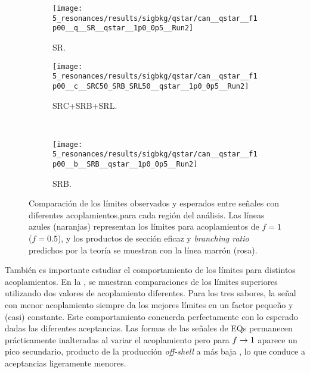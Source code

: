 \begin{figure}[ht!]
    \centering
    \begin{subfigure}[t]{0.49\linewidth}
        \centering
        \texttt{[image: 5\_resonances/results/sigbkg/qstar/can\_\_qstar\_\_f1p00\_\_q\_\_SR\_\_qstar\_\_1p0\_0p5\_\_Run2]}
        \caption{SR.}
        \label{fig:results:results:bkgsig:results:qstar:limits_couplings_comparison:SR}
    \end{subfigure}
    \hfill
    \begin{subfigure}[t]{0.49\linewidth}
        \centering
        \texttt{[image: 5\_resonances/results/sigbkg/qstar/can\_\_qstar\_\_f1p00\_\_c\_\_SRC50\_SRB\_SRL50\_\_qstar\_\_1p0\_0p5\_\_Run2]}
        \caption{SRC+SRB+SRL.}
        \label{fig:results:results:bkgsig:results:qstar:limits_couplings_comparison:SRC}
    \end{subfigure}\\
    \begin{subfigure}[t]{0.49\linewidth}
        \centering
        \texttt{[image: 5\_resonances/results/sigbkg/qstar/can\_\_qstar\_\_f1p00\_\_b\_\_SRB\_\_qstar\_\_1p0\_0p5\_\_Run2]}
        \caption{SRB.}
        \label{fig:results:results:bkgsig:results:qstar:limits_couplings_comparison:SRB}
    \end{subfigure}
    \caption{Comparación de los límites observados y esperados entre señales con diferentes acoplamientos,para cada región del análisis. Las líneas azules (naranjas) representan los límites para acoplamientos de \(f=1\) (\(f=0.5\)), y los productos de sección eficaz y \textit{branching ratio} predichos por la teoría se muestran con la línea marrón (rosa).}
    \label{fig:results:results:bkgsig:results:qstar:limits_couplings_comparison}
\end{figure}

También es importante estudiar el comportamiento de los límites para distintos acoplamientos. En la \Fig{\ref{fig:results:results:bkgsig:results:qstar:limits_couplings_comparison}}, se muestran comparaciones de los límites superiores utilizando dos valores de acoplamiento diferentes. Para los tres sabores, la señal con menor acoplamiento siempre da los mejores límites en un factor pequeño y (casi) constante. Este comportamiento concuerda perfectamente con lo esperado dadas las diferentes aceptancias. Las formas de las señales de \acp{EQ} permanecen prácticamente inalteradas al variar el acoplamiento pero para \(f\rightarrow 1\) aparece un pico secundario, producto de la producción \textit{off-shell} a más baja \myj, lo que conduce a aceptancias ligeramente menores.


